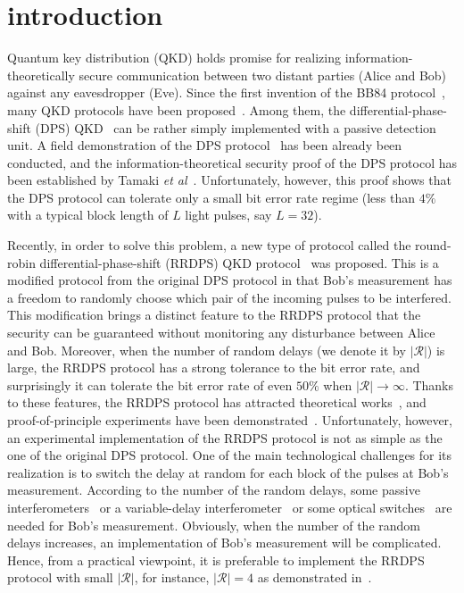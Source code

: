 \documentclass[twocolumn,superscriptaddress,pra,footinbib,notitlepage]{revtex4-1}
\newcommand{\1}{\mbox{1}\hspace{-0.25em}\mbox{l}}
\newcommand{\abs}[1]{\lvert#1\rvert}
\begin{document}
\section{introduction}
Quantum key distribution (QKD) holds promise for realizing information-theoretically secure communication between two distant parties (Alice and Bob) against any eavesdropper (Eve). 
Since the first invention of the BB84 protocol~\cite{bennett1984advances}, many QKD protocols have been proposed~\cite{ekert1991quantum, bennett1992quantum, bruss1998optimal, inoue2002differential, scarani2004quantum, gisin2004towards}.
Among them, the differential-phase-shift (DPS) QKD~\cite{inoue2002differential} can be rather simply implemented with a passive detection unit.
A field demonstration of the DPS protocol~\cite{sasaki2011field} has been already been conducted, and the information-theoretical security proof of the DPS protocol has been established by Tamaki \textit{et al}~\cite{tamaki2012unconditional, Note1}.
Unfortunately, however, this proof shows that the DPS protocol can tolerate only a small bit error rate regime (less than $4\%$ with a typical block length of $L$ light pulses, say $L=32$).

Recently, in order to solve this problem, 
a new type of protocol called the round-robin differential-phase-shift (RRDPS) QKD protocol~\cite{sasaki2014practical} was proposed. 
This is a modified protocol from the original DPS protocol in that Bob's measurement has a freedom to randomly choose which pair of the incoming pulses to be interfered.
This modification brings a distinct feature to the RRDPS protocol that the security can be guaranteed without monitoring any disturbance between Alice and Bob.
Moreover, when the number of random delays (we denote it by $\abs{\mathcal{R}}$) is large, the RRDPS protocol has a strong tolerance to the bit error rate, and surprisingly it can tolerate the bit error rate of even $50\%$ when $\abs{\mathcal{R}}\to\infty$.
Thanks to these features, the RRDPS protocol has attracted theoretical works~\cite{mizutani2015robustness, zhang2015round, takesue2015experimental, chau2016qudit, sasaki2016quantum}, and proof-of-principle experiments 
have been demonstrated~\cite{guan2015experimental, li2016experimental, takesue2015experimental, wang2015experimental}. 
Unfortunately, however, an experimental implementation of the RRDPS protocol is not as simple as the one of the original DPS protocol. 
One of the main technological challenges for its realization is to switch the delay at random for each block of the pulses at Bob's measurement.
According to the number of the random delays, some passive interferometers~\cite{takesue2015experimental} or a variable-delay interferometer~\cite{li2016experimental} or some optical switches~\cite{wang2015experimental} are needed for Bob's measurement.
Obviously, when the number of the random delays increases, an implementation of Bob's measurement will be complicated.
Hence, from a practical viewpoint, it is preferable to implement the RRDPS protocol with small $\abs{\mathcal{R}}$, for instance, $\abs{\mathcal{R}}=4$ as demonstrated in~\cite{takesue2015experimental}.
\end{document}
